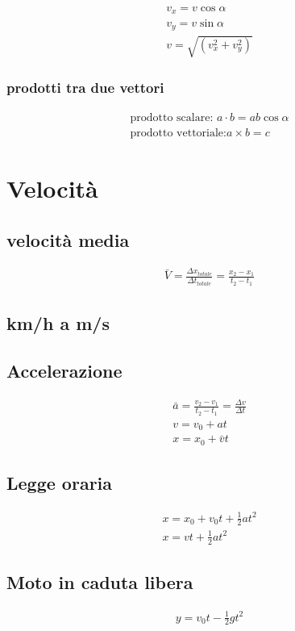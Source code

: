 \documentclass{article}
\begin{document}
\begin{eqnarray}
  \label{eq:scompvetto}
  v_x=v\cos \alpha\\
  v_y=v\sin \alpha{}\\
  v=\sqrt{(v_x^2+v_y^2)}
\end{eqnarray}

\subsubsection{prodotti tra due vettori}
\label{sec:prodtraduevett}

\begin{eqnarray}
  \label{eq:prodtraduevett}
  \text{prodotto scalare: }a\cdot b=ab\cos \alpha{}\\
  \text{prodotto vettoriale:}a \times b=c
\end{eqnarray}

\section{Velocità}
\label{sec:velocità}

\subsection{velocità media}
\label{sec:velmedia}


\begin{eqnarray}
  \label{eq:velmedia}
  \bar{V} = \frac{\Delta x_{totale}}{\Delta t_{totale}}=\frac{x_2-x_1}{t_2-t_1}
\end{eqnarray}

\subsection{km/h a m/s}
\label{sec:km/hm/s}

\subsection{Accelerazione}
\label{sec:accelerarzione}

\begin{eqnarray}
  \label{eq:acc}
  \bar{a}=\frac{v_2-v_1}{t_2-t_1}=\frac{\Delta v}{\Delta t}\\
  v=v_0+at\\
  x=x_0+\bar{v} t
\end{eqnarray}

\subsection{Legge oraria}
\label{sec:leggeoraria}

\begin{eqnarray}
  \label{eq:leggeo}
  x=x_0+v_0t + \frac{1}{2} at^2\\
  x=vt+\frac{1}{2} at^2
\end{eqnarray}

\subsection{Moto in caduta libera}
\label{sec:motocadutalibera}

\begin{eqnarray}
  \label{eq:cadutalibera}
  y=v_0t-\frac{1}{2}gt^2
\end{eqnarray}
\end{document}
